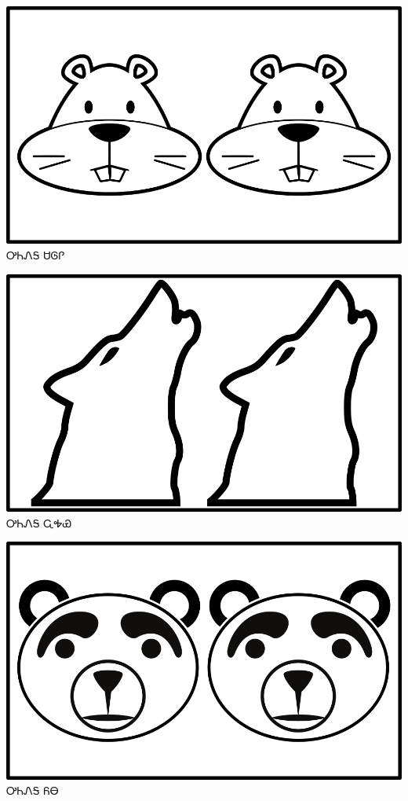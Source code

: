 \documentclass[avery5371]{flashcards}%
\begin{document}
    \begin{flashcard}{
        \includegraphics[width=0.95\columnwidth,height=.51\columnwidth,keepaspectratio]{../artwork/objects-animate/anitali-saloli}
    }
        \Huge ᎤᏂᏁᎦ ᏌᎶᎵ
    \end{flashcard}

    \begin{flashcard}{
        \includegraphics[width=0.95\columnwidth,height=.51\columnwidth,keepaspectratio]{../artwork/objects-animate/anitali-wahya}
    }
        \Huge ᎤᏂᏁᎦ ᏩᎭᏯ
    \end{flashcard}

    \begin{flashcard}{
        \includegraphics[width=0.95\columnwidth,height=.51\columnwidth,keepaspectratio]{../artwork/objects-animate/anitali-yona}
    }
        \Huge ᎤᏂᏁᎦ ᏲᎾ
    \end{flashcard}
\end{document}
